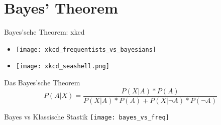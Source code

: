 \section{Bayes' Theorem}


\begin{frame}[c]{Bayes'sche Theorem: xkcd}
    \begin{multicols}{2}
    \begin{itemize}
        \item[]<1> \texttt{[image: xkcd\_frequentists\_vs\_bayesians]}
        \item[]<2> \texttt{[image: xkcd\_seashell.png]}
    \end{itemize}
    \end{multicols}
\end{frame}


\begin{frame}[c]{Das Bayes'sche Theorem}
    \Large
    \[
        P(A|X) = \frac{P(X|A) * P(A)}{P(X|A) * P(A) + P(X|\neg A) * P(\neg A)}
    \]
\end{frame}


\begin{frame}[c]{Bayes vs Klassische Stastik}
    \texttt{[image: bayes\_vs\_freq]}
\end{frame}



